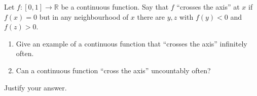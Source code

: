 \documentclass{article}
\begin{document}
\setlength{\parindent}{0pt}
Let $f:[0,1]\to \mathbb{R}$ be a continuous function.
Say that $f$ ``crosses the axis'' at $x$ if $f(x)=0$ but in any neighbourhood of $x$ there are $y,z$ with $f(y)<0$ and $f(z)>0$.
\begin{enumerate}[label=\alph*)]
\item Give an example of a continuous function that ``crosses the axis'' infinitely often.
\item Can a continuous function ``cross the axis'' uncountably often? 
\end{enumerate}
Justify your answer.
\end{document}
